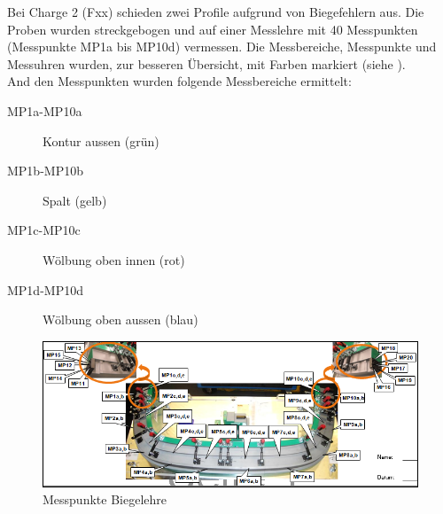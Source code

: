\documentclass[12pt,a4paper,parskip]{scrartcl}
\begin{document}
 Bei Charge 2 (Fxx) schieden zwei Profile aufgrund von Biegefehlern aus. Die Proben wurden streckgebogen und auf einer Messlehre  mit 40 Messpunkten (Messpunkte MP1a bis MP10d) vermessen. Die Messbereiche, Messpunkte und Messuhren wurden, zur besseren Übersicht, mit Farben markiert (siehe ).  \\
 And den Messpunkten wurden folgende Messbereiche ermittelt:
 \begin{description}
 \item[MP1a-MP10a] Kontur aussen (grün)
 \item[MP1b-MP10b] Spalt (gelb)
 \item[MP1c-MP10c] Wölbung oben innen (rot)
 \item[MP1d-MP10d] Wölbung oben aussen (blau)
 \end{description}
\begin{figure}[!htb]
\centering
\includegraphics[width=1\linewidth,height=.2\textheight]{messpunktevdkda3}
\caption{Messpunkte Biegelehre}
\label{fig:messpunktevdkda3}
\end{figure} 
 
 
 
\end{document}
